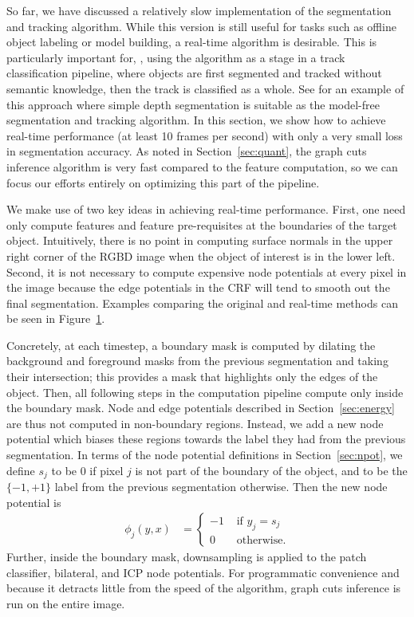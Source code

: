 \documentclass[graybox]{svmult}
\begin{document}
So far, we have discussed a relatively slow implementation of the segmentation and tracking algorithm.   While this version is still useful for tasks such as offline object labeling or model building, a real-time algorithm is desirable.  This is particularly important for, \eg, using the algorithm as a stage in a track classification pipeline, where objects are first segmented and tracked without semantic knowledge, then the track is classified as a whole.  See \cite{teichman2011a} for an example of this approach where simple depth segmentation is suitable as the model-free segmentation and tracking algorithm.  In this section, we show how to achieve real-time performance (\ie at least 10 frames per second) with only a very small loss in segmentation accuracy.  As noted in Section~\ref{sec:quant}, the graph cuts inference algorithm is very fast compared to the feature computation, so we can focus our efforts entirely on optimizing this part of the pipeline.

We make use of two key ideas in achieving real-time performance.  First, one need only compute features and feature pre-requisites at the boundaries of the target object.  Intuitively, there is no point in computing surface normals in the upper right corner of the RGBD image when the object of interest is in the lower left.  Second, it is not necessary to compute expensive node potentials at every pixel in the image because the edge potentials in the CRF will tend to smooth out the final segmentation.  Examples comparing the original and real-time methods can be seen in Figure~\ref{fig:mask}.

\begin{figure}
  \centering
  \caption{}
  \label{fig:mask}
\end{figure}


Concretely, at each timestep, a boundary mask is computed by dilating the background and foreground masks from the previous segmentation and taking their intersection; this provides a mask that highlights only the edges of the object.  Then, all following steps in the computation pipeline compute only inside the boundary mask.  Node and edge potentials described in Section~\ref{sec:energy} are thus not computed in non-boundary regions.  Instead, we add a new node potential which biases these regions towards the label they had from the previous segmentation.  In terms of the node potential definitions in Section~\ref{sec:npot}, we define $s_j$ to be 0 if pixel $j$ is not part of the boundary of the object, and to be the $\{-1, +1\}$ label from the previous segmentation otherwise.  Then the new node potential is
\begin{align*}
  \phi_j(y, x) & =
  \left\{
  \begin{array}{rl}
    -1 & \mbox{ if } y_j = s_j \\
    0 & \mbox{ otherwise.}
  \end{array}
  \right.
\end{align*}
Further, inside the boundary mask, downsampling is applied to the patch classifier, bilateral, and ICP node potentials.  For programmatic convenience and because it detracts little from the speed of the algorithm, graph cuts inference is run on the entire image.
\end{document}
